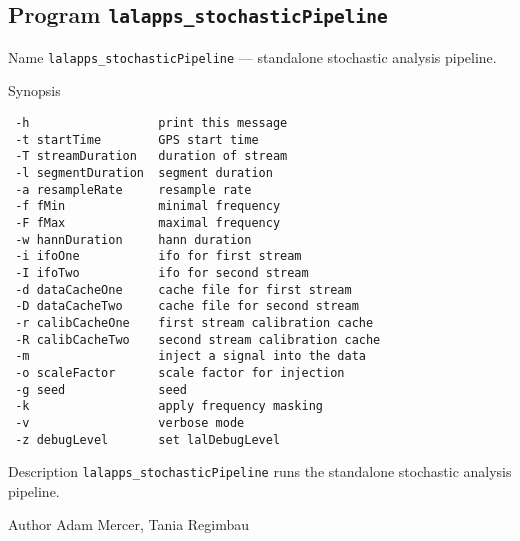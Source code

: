 \subsection{Program \texttt{lalapps\_stochasticPipeline}}
\label{program:lalapps-stochasticPipeline}

\begin{entry}
\item[Name]
\verb$lalapps_stochasticPipeline$ --- standalone stochastic analysis
pipeline.

\item[Synopsis]
\begin{verbatim}
 -h                  print this message
 -t startTime        GPS start time
 -T streamDuration   duration of stream
 -l segmentDuration  segment duration
 -a resampleRate     resample rate
 -f fMin             minimal frequency
 -F fMax             maximal frequency
 -w hannDuration     hann duration
 -i ifoOne           ifo for first stream
 -I ifoTwo           ifo for second stream
 -d dataCacheOne     cache file for first stream
 -D dataCacheTwo     cache file for second stream
 -r calibCacheOne    first stream calibration cache
 -R calibCacheTwo    second stream calibration cache
 -m                  inject a signal into the data
 -o scaleFactor      scale factor for injection
 -g seed             seed
 -k                  apply frequency masking
 -v                  verbose mode
 -z debugLevel       set lalDebugLevel
\end{verbatim}

\item[Description] \verb$lalapps_stochasticPipeline$ runs the standalone
stochastic analysis pipeline.

\item[Author] 
Adam Mercer, Tania Regimbau
\end{entry}
